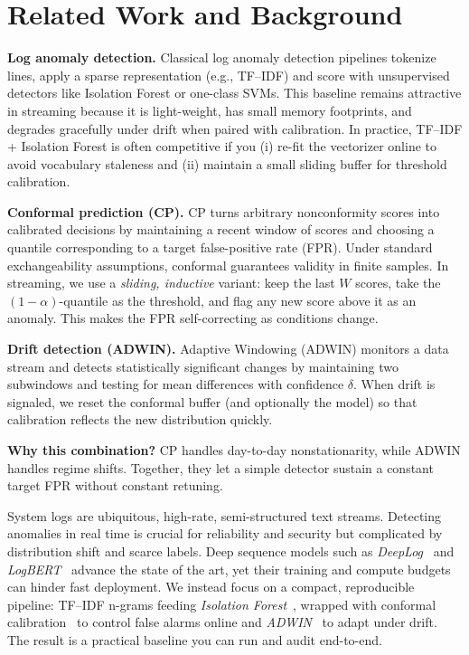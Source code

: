 \documentclass[10pt,twocolumn]{article}
\begin{document}
\section{Related Work and Background}

\textbf{Log anomaly detection.} Classical log anomaly detection pipelines tokenize lines, apply a sparse representation (e.g., TF--IDF) and score with unsupervised detectors like Isolation Forest or one-class SVMs. This baseline remains attractive in streaming because it is light-weight, has small memory footprints, and degrades gracefully under drift when paired with calibration. In practice, TF--IDF + Isolation Forest is often competitive if you (i) re-fit the vectorizer online to avoid vocabulary staleness and (ii) maintain a small sliding buffer for threshold calibration.

\textbf{Conformal prediction (CP).} CP turns arbitrary nonconformity scores into calibrated decisions by maintaining a recent window of scores and choosing a quantile corresponding to a target false-positive rate (FPR). Under standard exchangeability assumptions, conformal guarantees validity in finite samples. In streaming, we use a \emph{sliding, inductive} variant: keep the last $W$ scores, take the $(1{-}\alpha)$-quantile as the threshold, and flag any new score above it as an anomaly. This makes the FPR self-correcting as conditions change.

\textbf{Drift detection (ADWIN).} Adaptive Windowing (ADWIN) monitors a data stream and detects statistically significant changes by maintaining two subwindows and testing for mean differences with confidence $\delta$. When drift is signaled, we reset the conformal buffer (and optionally the model) so that calibration reflects the new distribution quickly.\vspace{0.25em}

\noindent \textbf{Why this combination?} CP handles day-to-day nonstationarity, while ADWIN handles regime shifts. Together, they let a simple detector sustain a constant target FPR without constant retuning.


System logs are ubiquitous, high-rate, semi-structured text streams. Detecting anomalies in real time is crucial for reliability and security but complicated by distribution shift and scarce labels. Deep sequence models such as \emph{DeepLog}~\cite{du2017deeplog} and \emph{LogBERT}~\cite{guo2021logbert} advance the state of the art, yet their training and compute budgets can hinder fast deployment. We instead focus on a compact, reproducible pipeline: TF--IDF n-grams feeding \emph{Isolation Forest}~\cite{liu2008iforest}, wrapped with conformal calibration~\cite{vovk2005alrw,shafer2008tutorial} to control false alarms online and \emph{ADWIN}~\cite{bifet2007adwin} to adapt under drift. The result is a practical baseline you can run and audit end-to-end.
\end{document}
